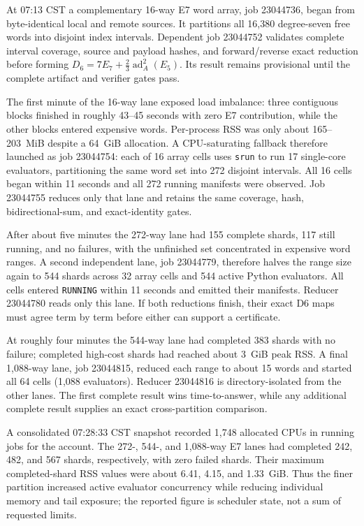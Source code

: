 \documentclass[10pt]{article}
\begin{document}
At 07:13 CST a complementary 16-way E7 word array, job 23044736, began from
byte-identical local and remote sources.  It partitions all 16,380 degree-seven
free words into disjoint index intervals.  Dependent job 23044752 validates
complete interval coverage, source and payload hashes, and forward/reverse
exact reduction before forming
$D_6=7E_7+\frac{2}{3}\operatorname{ad}_A^2(E_5)$.  Its result remains
provisional until the complete artifact and verifier gates pass.

The first minute of the 16-way lane exposed load imbalance: three contiguous
blocks finished in roughly 43--45 seconds with zero E7 contribution, while
the other blocks entered expensive words.  Per-process RSS was only about
165--203~MiB despite a 64~GiB allocation.  A CPU-saturating fallback therefore
launched as job 23044754: each of 16 array cells uses \texttt{srun} to run 17
single-core evaluators, partitioning the same word set into 272 disjoint
intervals.  All 16 cells began within 11 seconds and all 272 running manifests
were observed.  Job 23044755 reduces only that lane and retains the same
coverage, hash, bidirectional-sum, and exact-identity gates.

After about five minutes the 272-way lane had 155 complete shards, 117 still
running, and no failures, with the unfinished set concentrated in expensive
word ranges.  A second independent lane, job 23044779, therefore halves the
range size again to 544 shards across 32 array cells and 544 active Python
evaluators.  All cells entered \texttt{RUNNING} within 11 seconds and emitted
their manifests.  Reducer 23044780 reads only this lane.  If both reductions
finish, their exact D6 maps must agree term by term before either can support a
certificate.

At roughly four minutes the 544-way lane had completed 383 shards with no
failure; completed high-cost shards had reached about 3~GiB peak RSS.  A final
1,088-way lane, job 23044815, reduced each range to about 15 words and started
all 64 cells (1,088 evaluators).  Reducer 23044816 is directory-isolated from
the other lanes.  The first complete result wins time-to-answer, while any
additional complete result supplies an exact cross-partition comparison.

A consolidated 07:28:33 CST snapshot recorded 1,748 allocated CPUs in running
jobs for the account.  The 272-, 544-, and 1,088-way E7 lanes had completed
242, 482, and 567 shards, respectively, with zero failed shards.  Their maximum
completed-shard RSS values were about 6.41, 4.15, and 1.33~GiB.  Thus the finer
partition increased active evaluator concurrency while reducing individual
memory and tail exposure; the reported figure is scheduler state, not a sum of
requested limits.
\end{document}
